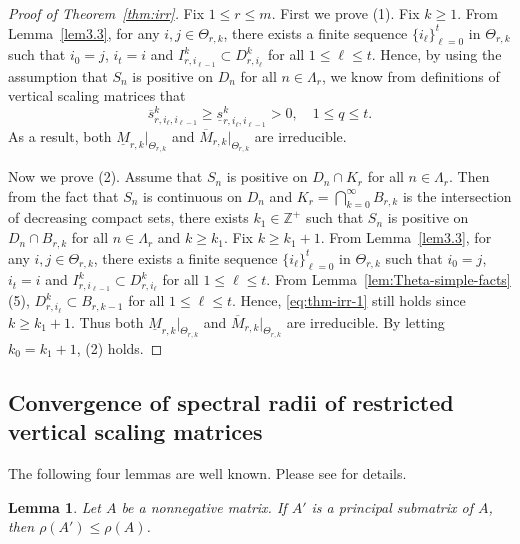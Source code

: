 \documentclass[11pt]{amsart}
\newtheorem{lem}[thm]{Lemma}
\theoremstyle{definition}
\theoremstyle{remark}
\numberwithin{equation}{section}
\newcommand{\bZp}{{{\mathbb Z}^+}}
\newcommand{\upM}{{\overline{M}}}
\newcommand{\lowM}{{\underline{M}}}
\newcommand{\ups}{{\overline{s} }}
\newcommand{\lows}{{\underline{s}}}
\begin{document}
 \begin{proof}[Proof of Theorem~\ref{thm:irr}]
 	Fix $1\leq r\leq m$. First we prove (1). Fix $k\geq 1$.	
 	From Lemma~\ref{lem3.3}, for any $i,j\in \Theta_{r,k}$, there exists a finite sequence $\{i_\ell\}_{\ell=0}^t$ in $\Theta_{r,k}$ such that $i_0=j$, $i_t=i$ and 
 	$I^k_{r,i_{\ell-1}}\subset D_{r,i_\ell}^k$ for all $1\leq \ell \leq t$. Hence, by using the assumption that $S_n$ is positive on $D_n$ for all $n\in \Lambda_r$, we know from definitions of vertical scaling matrices that
 	\begin{equation}\label{eq:thm-irr-1}
 	  \ups_{r,i_\ell,i_{\ell-1}}^{k} \geq \lows_{r,i_\ell,i_{\ell-1}}^{k}>0, \quad 1\leq q\leq t.
 	\end{equation}
    As a result, both $\lowM_{r,k}|_{\Theta_{r,k}}$ and $\upM_{r,k}|_{\Theta_{r,k}}$ are irreducible. 

 	Now we prove (2). Assume that $S_n$ is positive on $D_n\cap K_r$ for all $n\in\Lambda_r$. Then from the fact that $S_n$ is continuous on $D_n$ and $K_r=\bigcap_{k=0}^\infty B_{r,k}$ is the intersection of decreasing compact sets, there exists $k_1\in \bZp$ such that $S_n$ is positive on $D_n\cap B_{r,k}$ for all $n\in\Lambda_r$ and $k\geq k_1$. 
	 Fix $k\geq k_1+1$.	
 	From Lemma~\ref{lem3.3}, for any $i,j\in \Theta_{r,k}$, there exists a finite sequence $\{i_\ell\}_{\ell=0}^t$ in $\Theta_{r,k}$ such that $i_0=j$, $i_t=i$ and 
 	$I^k_{r,i_{\ell-1}}\subset D_{r,i_\ell}^k$ for all $1\leq \ell \leq t$. From Lemma~\ref{lem:Theta-simple-facts}(5), $D_{r,i_\ell}^k\subset B_{r,k-1}$ for all $1\leq \ell \leq t$. Hence, \eqref{eq:thm-irr-1} still holds since $k\geq k_1+1$. Thus both $\lowM_{r,k}|_{\Theta_{r,k}}$ and $\upM_{r,k}|_{\Theta_{r,k}}$ are irreducible.
	 By letting $k_0=k_1+1$, (2) holds. 
\end{proof}
 


\subsection{Convergence of spectral radii of restricted vertical scaling matrices}

The following four lemmas are well known. Please see \cite[Chapter 8]{HJ13} for details.

\begin{lem}\label{lem:psm}
Let $A$ be a nonnegative matrix. 
If $A'$ is a principal submatrix of $A$, then $\rho(A') \leq \rho(A)$.

\end{lem}
\end{document}
